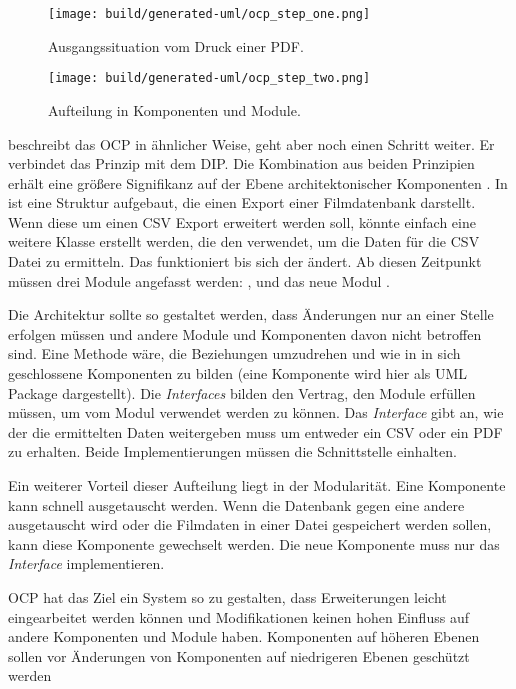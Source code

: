 \begin{figure}
  \centering
  \texttt{[image: build/generated-uml/ocp\_step\_one.png]}
   \caption{Ausgangssituation vom Druck einer PDF.}
   \label{fig:ocp_step_one}
\end{figure}

\begin{figure}
  \centering
  \texttt{[image: build/generated-uml/ocp\_step\_two.png]}
   \caption{Aufteilung in Komponenten und Module.}
   \label{fig:ocp_step_two}
\end{figure}

 beschreibt das \ac{OCP} in ähnlicher Weise, geht aber noch einen Schritt weiter. Er verbindet das Prinzip mit dem \ac{DIP}. Die Kombination aus beiden Prinzipien erhält eine größere Signifikanz auf der Ebene architektonischer Komponenten \citep[vgl.][70]{martin2018}. In  ist eine Struktur aufgebaut, die einen Export einer Filmdatenbank darstellt. Wenn diese um einen CSV Export erweitert werden soll, könnte einfach eine weitere Klasse erstellt werden, die den  verwendet, um die Daten für die CSV Datei zu ermitteln. Das funktioniert bis sich der  ändert. Ab diesen Zeitpunkt müssen drei Module angefasst werden: ,  und das neue Modul .

Die Architektur sollte so gestaltet werden, dass Änderungen nur an einer Stelle erfolgen müssen und andere Module und Komponenten davon nicht betroffen sind. Eine Methode wäre, die Beziehungen umzudrehen und wie in  in sich geschlossene Komponenten zu bilden (eine Komponente wird hier als UML Package dargestellt). Die \textit{Interfaces} bilden den Vertrag, den Module erfüllen müssen, um vom Modul verwendet werden zu können. Das \textit{Interface}  gibt \zb an, wie der  die ermittelten Daten weitergeben muss um entweder ein CSV oder ein PDF zu erhalten. Beide Implementierungen müssen die Schnittstelle einhalten.

Ein weiterer Vorteil dieser Aufteilung liegt in der Modularität. Eine Komponente kann schnell ausgetauscht werden. Wenn die Datenbank gegen eine andere ausgetauscht wird oder die Filmdaten in einer Datei gespeichert werden sollen, kann diese Komponente gewechselt werden. Die neue Komponente muss nur das \textit{Interface}  implementieren.

\ac{OCP} hat das Ziel ein System so zu gestalten, dass Erweiterungen leicht eingearbeitet werden können und Modifikationen keinen hohen Einfluss auf andere Komponenten und Module haben. Komponenten auf höheren Ebenen sollen vor Änderungen von Komponenten auf niedrigeren Ebenen geschützt werden \citep[vgl.][75]{martin2018}


